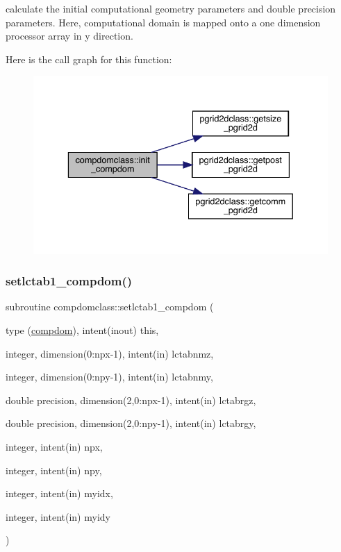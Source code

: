 calculate the initial computational geometry parameters and double precision parameters. Here, computational domain is mapped onto a one dimension processor array in y direction. 

Here is the call graph for this function\+:\nopagebreak
\begin{figure}[H]
\begin{center}
\leavevmode
\includegraphics[width=336pt]{namespacecompdomclass_acdfdc48f4091ad70b76c1c7ed66c10b0_cgraph}
\end{center}
\end{figure}
\mbox{\label{namespacecompdomclass_a60f5ad087b624e541fe9c0872e1c4b90}} 
\subsubsection{\texorpdfstring{setlctab1\_compdom()}{setlctab1\_compdom()}}
{\footnotesize\ttfamily subroutine compdomclass\+::setlctab1\+\_\+compdom (\begin{DoxyParamCaption}\item[{type (\mbox{\hyperlink{namespacecompdomclass_structcompdomclass_1_1compdom}{compdom}}), intent(inout)}]{this,  }\item[{integer, dimension(0\+:npx-\/1), intent(in)}]{lctabnmz,  }\item[{integer, dimension(0\+:npy-\/1), intent(in)}]{lctabnmy,  }\item[{double precision, dimension(2,0\+:npx-\/1), intent(in)}]{lctabrgz,  }\item[{double precision, dimension(2,0\+:npy-\/1), intent(in)}]{lctabrgy,  }\item[{integer, intent(in)}]{npx,  }\item[{integer, intent(in)}]{npy,  }\item[{integer, intent(in)}]{myidx,  }\item[{integer, intent(in)}]{myidy }\end{DoxyParamCaption})}

